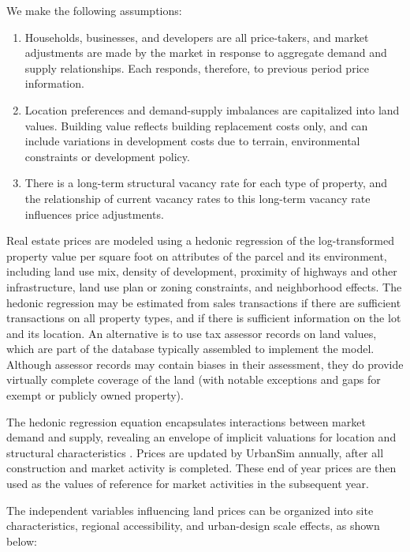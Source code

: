 We make the following assumptions:

\begin{enumerate}
\item Households, businesses, and developers are all
price-takers, and market adjustments are made by the market in
response to aggregate demand and supply relationships.  Each
responds, therefore, to previous period price information.

\item
Location preferences and demand-supply imbalances are capitalized
into land values.  Building value reflects building replacement
costs only, and can include variations in development costs due to
terrain, environmental constraints or development policy.

\item
There is a long-term structural vacancy rate for each type of
property, and the relationship of current vacancy rates to this
long-term vacancy rate influences price adjustments.
\end{enumerate}

Real estate prices are modeled using a hedonic regression of the log-transformed
property value per square foot
on attributes of the parcel and its environment, including land use
mix, density of development, proximity of highways and other
infrastructure, land use plan or zoning constraints, and
neighborhood effects.  The hedonic regression may be estimated
from sales transactions if there are sufficient transactions on
all property types, and if there is sufficient information on the
lot and its location.  An alternative is to use tax assessor
records on land values, which are part of the database typically
assembled to implement the model.  Although assessor records may
contain biases in their assessment, they do provide virtually
complete coverage of the land (with notable exceptions and gaps
for exempt or publicly owned property).

The hedonic regression equation encapsulates interactions between
market demand and supply, revealing an envelope of implicit
valuations for location and structural characteristics \cite{dipasquale-wheaton-1996}.
Prices are updated by UrbanSim annually, after all construction and market
activity is completed.  These end of year prices are then used as
the values of reference for market activities in the subsequent
year.

The independent variables influencing land prices can be organized
into site characteristics, regional accessibility, and urban-design
scale effects, as shown below:


